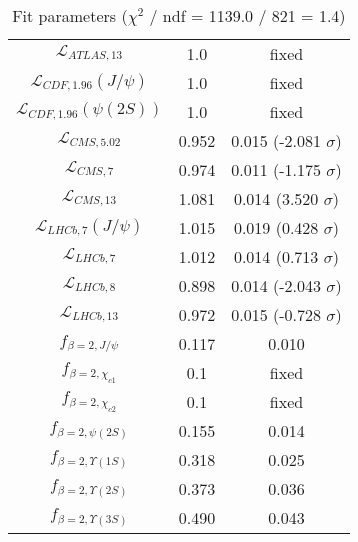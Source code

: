 \begin{table}[h!]
\begin{tabular}{c|c|c}
$\mathcal L_{ATLAS,13}$ & 1.0 & fixed \\
$\mathcal L_{CDF,1.96}(J/\psi)$ & 1.0 & fixed \\
$\mathcal L_{CDF,1.96}(\psi(2S))$ & 1.0 & fixed \\
$\mathcal L_{CMS,5.02}$ & 0.952 & 0.015 (-2.081 $\sigma$) \\
$\mathcal L_{CMS,7}$ & 0.974 & 0.011 (-1.175 $\sigma$) \\
$\mathcal L_{CMS,13}$ & 1.081 & 0.014 (3.520 $\sigma$) \\
$\mathcal L_{LHCb,7}(J/\psi)$ & 1.015 & 0.019 (0.428 $\sigma$) \\
$\mathcal L_{LHCb,7}$ & 1.012 & 0.014 (0.713 $\sigma$) \\
$\mathcal L_{LHCb,8}$ & 0.898 & 0.014 (-2.043 $\sigma$) \\
$\mathcal L_{LHCb,13}$ & 0.972 & 0.015 (-0.728 $\sigma$) \\
$f_{\beta=2,J/\psi}$ & 0.117 & 0.010 \\
$f_{\beta=2,\chi_{c1}}$ & 0.1 & fixed \\
$f_{\beta=2,\chi_{c2}}$ & 0.1 & fixed \\
$f_{\beta=2,\psi(2S)}$ & 0.155 & 0.014 \\
$f_{\beta=2,\Upsilon(1S)}$ & 0.318 & 0.025 \\
$f_{\beta=2,\Upsilon(2S)}$ & 0.373 & 0.036 \\
$f_{\beta=2,\Upsilon(3S)}$ & 0.490 & 0.043 \\
\end{tabular}
\caption{Fit parameters ($\chi^2$ / ndf = 1139.0 / 821 = 1.4)}
\end{table}
